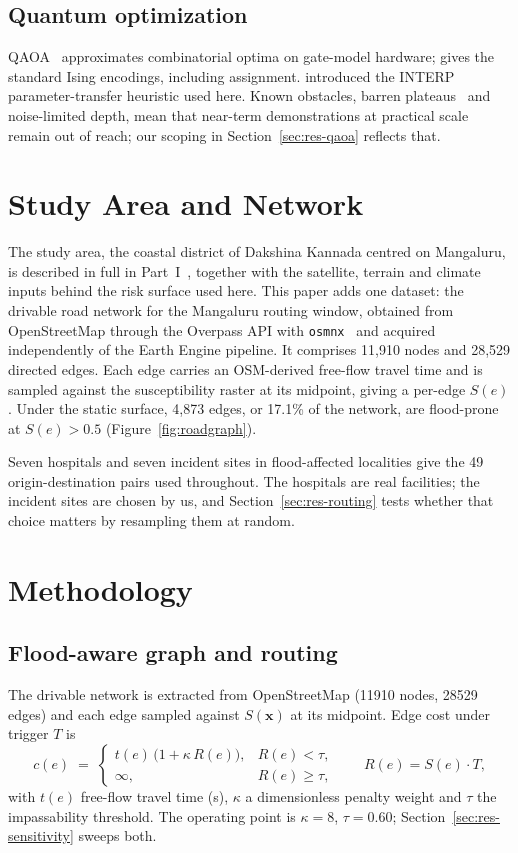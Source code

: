 \documentclass[journal]{IEEEtran}
\newcommand{\Sx}{S(\mathbf{x})}
\begin{document}
\subsection{Quantum optimization}
QAOA~\citep{farhi2014} approximates combinatorial optima on gate-model hardware;
\citet{lucas2014} gives the standard Ising encodings, including assignment.
\citet{zhou2020} introduced the INTERP parameter-transfer heuristic used here.
Known obstacles, barren plateaus~\citep{mcclean2018} and noise-limited depth,
mean that near-term demonstrations at practical scale remain out of reach; our
scoping in Section~\ref{sec:res-qaoa} reflects that.

\section{Study Area and Network}
The study area, the coastal district of Dakshina Kannada centred on Mangaluru,
is described in full in Part~I~\cite{parti}, together with the satellite,
terrain and climate inputs behind the risk surface used here. This paper adds
one dataset: the drivable road network for the Mangaluru routing window,
obtained from OpenStreetMap through the Overpass API with
\texttt{osmnx}~\cite{boeing2017} and acquired independently of the Earth Engine
pipeline. It comprises 11{,}910 nodes and 28{,}529 directed edges. Each edge
carries an OSM-derived free-flow travel time and is sampled against the
susceptibility raster at its midpoint, giving a per-edge $S(e)$. Under the
static surface, 4{,}873 edges, or 17.1\% of the network, are flood-prone at
$S(e)>0.5$ (Figure~\ref{fig:roadgraph}).

Seven hospitals and seven incident sites in flood-affected localities give the
49 origin-destination pairs used throughout. The hospitals are real facilities;
the incident sites are chosen by us, and Section~\ref{sec:res-routing} tests
whether that choice matters by resampling them at random.
\section{Methodology}
\subsection{Flood-aware graph and routing}
\label{sec:method-routing}
The drivable network is extracted from OpenStreetMap (\num{11910} nodes,
\num{28529} edges) and each edge sampled against $\Sx$ at its midpoint. Edge cost
under trigger $T$ is
\begin{equation}
c(e) \;=\;
\begin{cases}
t(e)\,\bigl(1+\kappa\,R(e)\bigr), & R(e) < \tau,\\[2pt]
\infty, & R(e) \ge \tau,
\end{cases}
\qquad R(e) = S(e)\cdot T,
\label{eq:edgecost}
\end{equation}
with $t(e)$ free-flow travel time (\si{\second}), $\kappa$ a dimensionless
penalty weight and $\tau$ the impassability threshold. The operating point is
$\kappa=8$, $\tau=0.60$; Section~\ref{sec:res-sensitivity} sweeps both.
\end{document}
